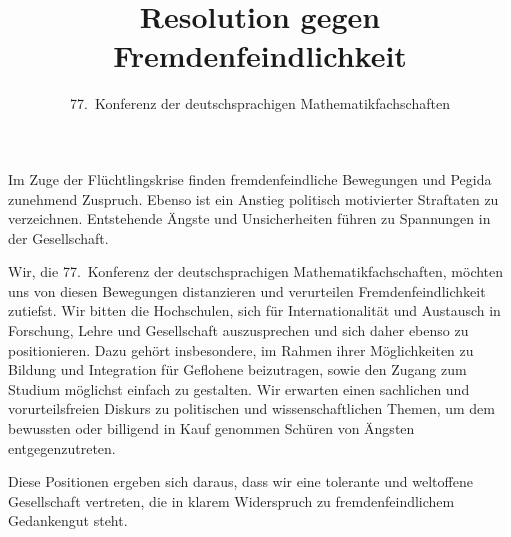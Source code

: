 \documentclass[12pt,a4paper,ngerman]{scrartcl}
\author{77.~Konferenz der deutschsprachigen
  Mathematikfachschaften}
\title{Resolution gegen Fremdenfeindlichkeit}
\begin{document}
\maketitle{}

Im Zuge der Flüchtlingskrise finden
fremdenfeindliche Bewegungen und Pegida
zunehmend Zuspruch. Ebenso ist ein Anstieg politisch motivierter
Straftaten zu verzeichnen. Entstehende Ängste und Unsicherheiten
führen zu Spannungen in der Gesellschaft.

Wir, die 77.~Konferenz der deutschsprachigen Mathematikfachschaften,
möchten uns von diesen Bewegungen distanzieren und verurteilen
Fremdenfeindlichkeit zutiefst. Wir bitten die
Hochschulen, sich für Internationalität und Austausch in Forschung,
Lehre und Gesellschaft auszusprechen und sich daher ebenso zu
positionieren. Dazu gehört insbesondere, im Rahmen ihrer Möglichkeiten
zu Bildung und Integration für Geflohene beizutragen, sowie den Zugang
zum Studium möglichst einfach zu gestalten. Wir
erwarten einen sachlichen und vorurteilsfreien Diskurs zu politischen
und wissenschaftlichen Themen, um dem bewussten oder billigend in Kauf genommen Schüren von Ängsten
entgegenzutreten.

Diese Positionen ergeben sich daraus, dass wir eine tolerante und
weltoffene Gesellschaft vertreten, die in klarem Widerspruch zu
fremdenfeindlichem Gedankengut steht.
\end{document}
